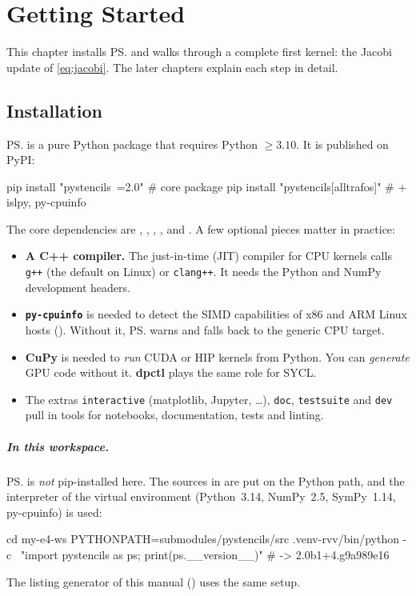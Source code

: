 \chapter{Getting Started}\label{ch:getting-started}

This chapter installs \ps{} and walks through a complete first kernel: the Jacobi update
of \cref{eq:jacobi}. The later chapters explain each step in detail.

\section{Installation}

\ps{} is a pure Python package that requires Python $\geq 3.10$. It is published on PyPI:
\begin{shcode}
pip install "pystencils~=2.0"            # core package
pip install "pystencils[alltrafos]"      # + islpy, py-cpuinfo
\end{shcode}
The core dependencies are , , ,
,  and . A few optional pieces matter in
practice:
\begin{itemize}
  \item \textbf{A C++ compiler.} The just-in-time (JIT) compiler for CPU kernels calls
        \texttt{g++} (the default on Linux) or \texttt{clang++}. It needs the Python and
        NumPy development headers.
  \item \textbf{\texttt{py-cpuinfo}} is needed to detect the SIMD capabilities of x86
        and ARM Linux hosts (). Without it, \ps{} warns and falls
        back to the generic CPU target.
  \item \textbf{CuPy} is needed to \emph{run} CUDA or HIP kernels from Python. You
        can \emph{generate} GPU code without it. \textbf{dpctl} plays the same role
        for SYCL.
  \item The extras \texttt{interactive} (matplotlib, Jupyter, \dots), \texttt{doc},
        \texttt{testsuite} and \texttt{dev} pull in tools for notebooks, documentation,
        tests and linting.
\end{itemize}

\paragraph{In this workspace.}
\ps{} is \emph{not} pip-installed here. The sources in 
are put on the Python path, and the interpreter of the virtual environment
 (Python~3.14, NumPy~2.5, SymPy~1.14, py-cpuinfo) is used:
\begin{shcode}
cd my-e4-ws
PYTHONPATH=submodules/pystencils/src .venv-rvv/bin/python -c \
    "import pystencils as ps; print(ps.__version__)"     # -> 2.0b1+4.g9a989e16
\end{shcode}
The listing generator of this manual () uses the same setup.

